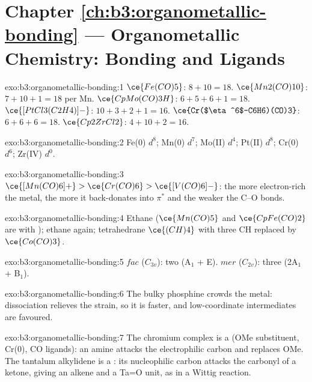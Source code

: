 \section*{Chapter \ref{ch:b3:organometallic-bonding} --- Organometallic Chemistry: Bonding and Ligands}

\begin{solution}{exo:b3:organometallic-bonding:1}
$\ce{Fe(CO)5}$: $8 + 10 = 18$. $\ce{Mn2(CO)10}$: $7 + 10 + 1 = 18$ per Mn. $\ce{CpMo(CO)3H}$: $6 + 5 + 6 + 1 =
18$. $\ce{[PtCl3(C2H4)]-}$: $10 + 3 + 2 + 1 = 16$. $\ce{Cr($\eta^6$-C6H6)(CO)3}$: $6 + 6 + 6 = 18$. $\ce{Cp2ZrCl2}$:
$4 + 10 + 2 = 16$.
\end{solution}

\begin{solution}{exo:b3:organometallic-bonding:2}
Fe(0) $d^8$; Mn(0) $d^7$; Mo(II) $d^4$; Pt(II) $d^8$; Cr(0) $d^6$; Zr(IV) $d^0$.
\end{solution}

\begin{solution}{exo:b3:organometallic-bonding:3}
$\ce{[Mn(CO)6]+} > \ce{Cr(CO)6} > \ce{[V(CO)6]-}$: the more electron-rich the metal, the more it
back-donates into $\pi^*$ and the weaker the C--O bonds.
\end{solution}

\begin{solution}{exo:b3:organometallic-bonding:4}
Ethane ($\ce{Mn(CO)5}$ and $\ce{CpFe(CO)2}$ are  with ); ethane again; tetrahedrane
$\ce{(CH)4}$ with three CH replaced by $\ce{Co(CO)3}$.
\end{solution}

\begin{solution}{exo:b3:organometallic-bonding:5}
$fac$ ($C_{3v}$): two (A$_1$ + E). $mer$ ($C_{2v}$): three (2A$_1$ + B$_1$).
\end{solution}

\begin{solution}{exo:b3:organometallic-bonding:6}
The bulky phosphine crowds the metal: dissociation relieves the strain, so it is
faster, and low-coordinate intermediates are favoured.
\end{solution}

\begin{solution}{exo:b3:organometallic-bonding:7}
The chromium complex is a  (OMe substituent, Cr(0), CO ligands): an
amine attacks the electrophilic  carbon and replaces OMe. The tantalum
alkylidene is a : its nucleophilic carbon attacks the carbonyl of a
ketone, giving an alkene and a Ta=O unit, as in a Wittig reaction.
\end{solution}

